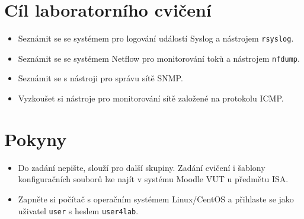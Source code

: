 %
\section*{Cíl laboratorního cvičení}
\begin{itemize}
  \item Seznámit se se systémem pro logování událostí Syslog a nástrojem {\tt rsyslog}.
  \item Seznámit se se systémem Netflow pro monitorování toků a nástrojem {\tt nfdump}.
  \item Seznámit se s nástroji pro správu sítě SNMP.
  \item Vyzkoušet si nástroje pro monitorování sítě založené na protokolu ICMP.
\end{itemize}

\section*{Pokyny}
\begin{itemize}
  \item Do zadání nepište, slouží pro další skupiny. Zadání cvičení i šablony konfiguračních souborů lze najít v systému Moodle VUT u předmětu ISA.
    
  
  \item Zapněte si počítač s operačním systémem Linux/CentOS a přihlaste se jako uživatel {\tt user} s heslem {\tt user4lab}.
\end{itemize}

\newpage

